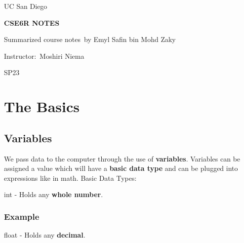 \documentclass[13pt,a4paper,oneside]{book}
\begin{document}
\begin{titlepage}
\begin{center}
	\normalsize
	\begin{doublespace}
	\vspace*{0.5in}
	UC San Diego\
	
	\vspace{1in}
	
	\textbf{\MakeUppercase{CSE6R NOTES}}
	
	\vspace{1in}
	
	Summarized course notes\
	by Emyl Safin bin Mohd Zaky\
	
	
	
	\vspace{0.75in}
	
	
	\vspace{0.75in}
	\end{doublespace} 
	
	\begin{singlespace}
	Instructor:\ 
	Moshiri Niema\
	
	\vfill
	SP23    
	\end{singlespace} 
\end{center}
\end{titlepage}
\frontmatter
\tableofcontents
\clearpage
\mainmatter
\lstset{
	style = mystyle
}
\lstset{
language = python
}
\lstset{
	inputpath = D:/Latex/Python/CSE6R/Notes/Code Listing
}
\chapter{The Basics}%
\label{cha:The Basics}
\section{Variables}%
\label{sec:Variables}
We pass data to the computer through the use of \textbf{variables}. Variables can be assigned a value which will have a \textbf{basic data type} and can be plugged into expressions like in math. 
Basic Data Types:
\begin{center}
	int - Holds any \textbf{whole number}.
\end{center}
\subsection*{Example}%
\label{sub:Example}

\begin{center}
	float - Holds any \textbf{decimal}.
\end{center}
\end{document}
